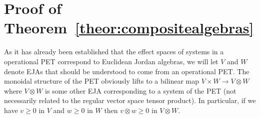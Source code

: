 \documentclass[a4paper,onecolumn,10pt,accepted=2019-05-03, issue=1, volume=1, shorttitle=papers/compositionality-1-1]{compositionalityarticle}
\DeclarePairedDelimiter{\inn}{\langle}{\rangle}
\newcounter{counter}
\numberwithin{counter}{section}
\newtheorem{theorem}[counter]{Theorem}
\begin{document}



\section{Proof of Theorem~\ref{theor:compositealgebras}}\label{sec:compositesappendix}

As it has already been established that the effect spaces of systems in a operational PET correspond to Euclidean Jordan algebras, we will let $V$ and $W$ denote EJAs that should be understood to come from an operational PET. The monoidal structure of the PET obviously lifts to a bilinear map $V\times W\rightarrow V\otimes W$ where $V\otimes W$ is some other EJA corresponding to a system of the PET (not necessarily related to the regular vector space tensor product). In particular, if we have $v\geq 0$ in $V$ and $w\geq 0$ in $W$ then $v\otimes w\geq 0$ in $V\otimes W$.
\end{document}
